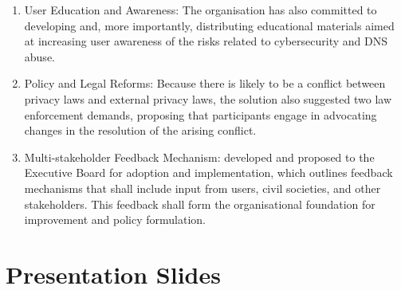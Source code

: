 \begin{itemize}
\begin{enumerate}
    \item User Education and Awareness: The organisation has also committed to developing and, more importantly, distributing educational materials aimed at increasing user awareness of the risks related to cybersecurity and DNS abuse. 
    \item Policy and Legal Reforms: Because there is likely to be a conflict between privacy laws and external privacy laws, the solution also suggested two law enforcement demands, proposing that participants engage in advocating changes in the resolution of the arising conflict. 
    \item Multi-stakeholder Feedback Mechanism: developed and proposed to the Executive Board for adoption and implementation, which outlines feedback mechanisms that shall include input from users, civil societies, and other stakeholders. This feedback shall form the organisational foundation for improvement and policy formulation.
    \end{enumerate}
        
\end{itemize}

\section{Presentation Slides}



